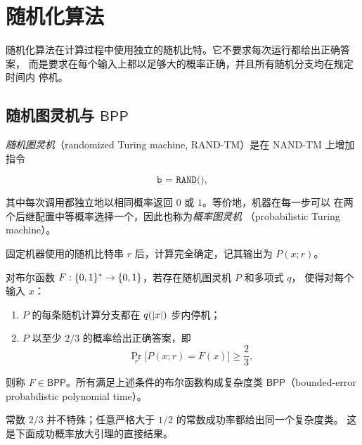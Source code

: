 \chapter{随机化算法}
\label{chap:randomized-algorithms}

\setcounter{lecture}{13}
\lecture
\label{lec:randomized-algorithms}

随机化算法在计算过程中使用独立的随机比特。它不要求每次运行都给出正确答案，
而是要求在每个输入上都以足够大的概率正确，并且所有随机分支均在规定时间内
停机。

\section{随机图灵机与 \texorpdfstring{$\mathsf{BPP}$}{BPP}}

\begin{definition}[随机图灵机]
  \label{def:randomized-turing-machine}
  \emph{随机图灵机}（randomized Turing machine, RAND-TM）是在 NAND-TM
  上增加指令

  \[
    \texttt{b = RAND()},
  \]

  其中每次调用都独立地以相同概率返回 $0$ 或 $1$。等价地，机器在每一步可以
  在两个后继配置中等概率选择一个，因此也称为\emph{概率图灵机}
  （probabilistic Turing machine）。

  固定机器使用的随机比特串 $r$ 后，计算完全确定，记其输出为 $P(x;r)$。
\end{definition}

\begin{definition}
  \label{def:bpp}
  对布尔函数 $F:\{0,1\}^{*}\to\{0,1\}$，若存在随机图灵机 $P$ 和多项式 $q$，
  使得对每个输入 $x$：

  \begin{enumerate}[label=(\arabic*),leftmargin=3em]
    \item $P$ 的每条随机计算分支都在 $q(\lvert x\rvert)$ 步内停机；
    \item $P$ 以至少 $2/3$ 的概率给出正确答案，即
      \[
        \Pr_r\bigl[P(x;r)=F(x)\bigr]\geq\frac23,
      \]
  \end{enumerate}

  则称 $F\in\mathsf{BPP}$。所有满足上述条件的布尔函数构成复杂度类
  $\mathsf{BPP}$（bounded-error probabilistic polynomial time）。
\end{definition}

常数 $2/3$ 并不特殊；任意严格大于 $1/2$ 的常数成功率都给出同一个复杂度类。
这是下面成功概率放大引理的直接结果。

